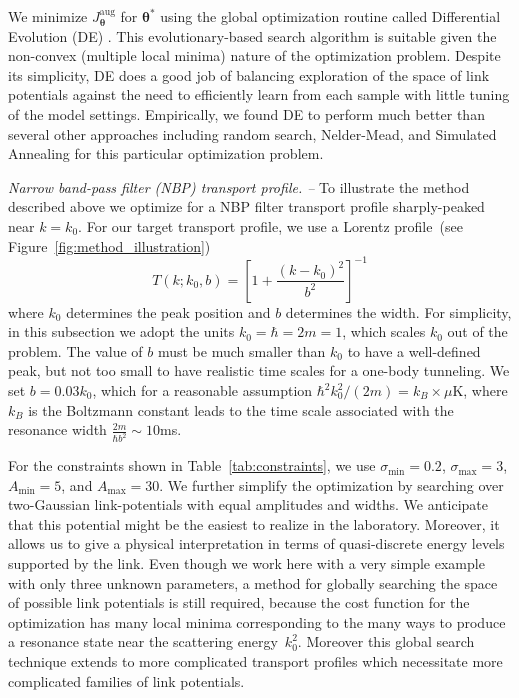 \documentclass[twocolumn,amsmath,amssymb,showpacs,prl,superscriptaddress,aps]{revtex4-1}
\begin{document}
We minimize $J_{\bm{\theta}}^{\mathrm{aug}}$ for $\bm{\theta}^*$ using the global optimization routine called Differential Evolution (DE) \cite{storn1997differential}. This evolutionary-based search algorithm is suitable given the non-convex (multiple local minima) nature of the optimization problem. Despite its simplicity, DE does a good job of balancing exploration of the space of link potentials against the need to efficiently learn from each sample with little tuning of the model settings. Empirically, we found DE to perform much better than several other approaches including random search, Nelder-Mead, and Simulated Annealing for this particular optimization problem.



{\it Narrow band-pass filter (NBP) transport profile. --}
To illustrate the method described above we optimize for a NBP filter transport profile sharply-peaked near $k=k_0$. 
For our target transport profile, we use a Lorentz profile~(see Figure~\ref{fig:method_illustration})
\begin{equation}\label{eq:Ttarget}
  T(k; k_0,b) = \left[1 + \frac{(k-k_0)^2}{b^2}\right]^{-1}
\end{equation}
where $k_0$ determines the peak position and $b$ determines the width. 
For simplicity, in this subsection we adopt the units $k_0=\hbar=2m=1$, which scales $k_0$
out of the problem. The value of $b$ must be much smaller than $k_0$ 
to have a well-defined peak, but not too small to have realistic time scales
for a one-body tunneling. We set $b=0.03 k_0$, which for a reasonable assumption 
$\hbar^2k_0^2/(2m)=k_B\times \mu$K, where $k_B$ is the Boltzmann constant leads to 
the time scale associated with the resonance width $\frac{2m}{\hbar b^2}\sim 10$ms.

 For the constraints shown in Table~\ref{tab:constraints}, we use $\sigma_{\mathrm{min}}=0.2$, $\sigma_{\mathrm{max}}=3$, $A_{\mathrm{min}}=5$, and $A_{\mathrm{max}}=30$. We further simplify the optimization by searching over two-Gaussian link-potentials with equal amplitudes and widths. We anticipate that this potential might be the easiest to realize in the laboratory. Moreover, it allows us to give a physical interpretation in terms of quasi-discrete energy levels supported by the link.  Even though we work here with a very simple example with only three unknown parameters, a method for globally searching the space of possible link potentials is still required, because the cost function for the optimization has many local minima corresponding to the many ways to produce a resonance state near the scattering energy~$k_0^2$. Moreover this global search technique extends to more complicated transport profiles which necessitate more complicated families of link potentials.
\end{document}
